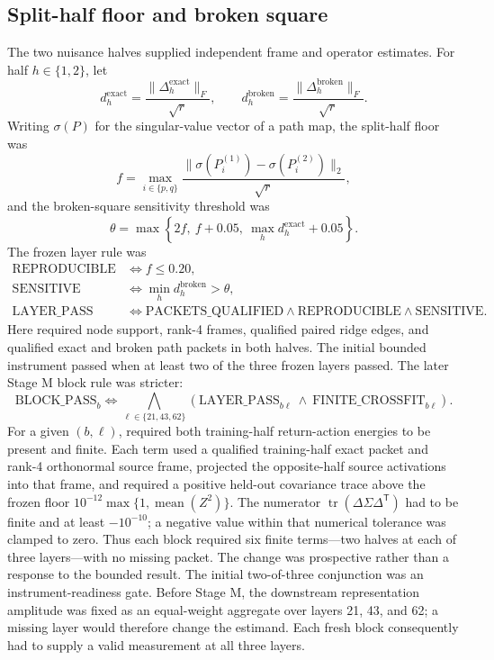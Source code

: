 \documentclass[10pt,a4paper]{article}
\newcommand{\code}[1]{\texttt{\detokenize{#1}}}
\begin{document}
\subsection{Split-half floor and broken square}

The two nuisance halves supplied independent frame and operator estimates. For half $h\in\{1,2\}$, let
\begin{equation}
 d_h^{\mathrm{exact}}=\frac{\|\Delta_h^{\mathrm{exact}}\|_F}{\sqrt r},
 \qquad
 d_h^{\mathrm{broken}}=\frac{\|\Delta_h^{\mathrm{broken}}\|_F}{\sqrt r}.
 \label{eq:normalized-responses}
\end{equation}
Writing $\sigma(P)$ for the singular-value vector of a path map, the split-half floor was
\begin{equation}
 f=\max_{i\in\{p,q\}}
 \frac{\|\sigma(P_i^{(1)})-\sigma(P_i^{(2)})\|_2}{\sqrt r},
 \label{eq:split-floor}
\end{equation}
and the broken-square sensitivity threshold was
\begin{equation}
 \theta=\max\!\left\{2f,\ f+0.05,\
 \max_h d_h^{\mathrm{exact}}+0.05\right\}.
 \label{eq:broken-threshold}
\end{equation}
The frozen layer rule was
\begin{align}
 \mathrm{REPRODUCIBLE}&\iff f\leq0.20,\\
 \mathrm{SENSITIVE}&\iff \min_h d_h^{\mathrm{broken}}>\theta,\\
 \mathrm{LAYER\_PASS}&\iff
 \mathrm{PACKETS\_QUALIFIED}\land
 \mathrm{REPRODUCIBLE}\land\mathrm{SENSITIVE}.
 \label{eq:layer-pass}
\end{align}
Here \code{PACKETS_QUALIFIED} required node support, rank-4 frames, qualified paired ridge edges, and qualified exact and broken path packets in both halves. The initial bounded instrument passed when at least two of the three frozen layers passed. The later Stage M block rule was stricter:
\begin{equation}
 \mathrm{BLOCK\_PASS}_b\iff
 \bigwedge_{\ell\in\{21,43,62\}}
 \left(\mathrm{LAYER\_PASS}_{b\ell}
 \ \land\ \mathrm{FINITE\_CROSSFIT}_{b\ell}\right).
 \label{eq:block-pass}
\end{equation}
For a given $(b,\ell)$, \code{FINITE_CROSSFIT} required both training-half return-action energies to be present and finite. Each term used a qualified training-half exact packet and rank-4 orthonormal source frame, projected the opposite-half source activations into that frame, and required a positive held-out covariance trace above the frozen floor $10^{-12}\max\{1,\operatorname{mean}(Z^2)\}$. The numerator $\operatorname{tr}(\Delta\Sigma\Delta^{\mathsf T})$ had to be finite and at least $-10^{-10}$; a negative value within that numerical tolerance was clamped to zero. Thus each block required six finite terms---two halves at each of three layers---with no missing packet.
The change was prospective rather than a response to the bounded result. The initial two-of-three conjunction was an instrument-readiness gate. Before Stage M, the downstream representation amplitude was fixed as an equal-weight aggregate over layers 21, 43, and 62; a missing layer would therefore change the estimand. Each fresh block consequently had to supply a valid measurement at all three layers.
\end{document}
